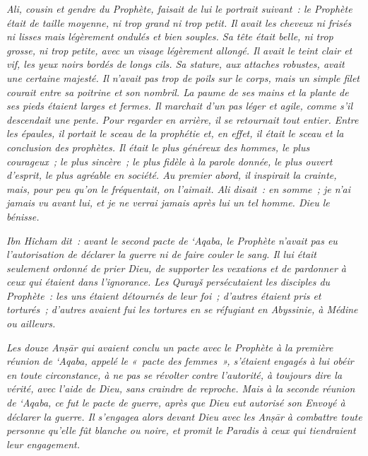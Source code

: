 \emph{Ali, cousin et gendre du Prophète, faisait de lui le portrait
suivant~: le Prophète était de taille moyenne, ni trop grand ni trop
petit. Il avait les cheveux ni frisés ni lisses mais légèrement ondulés
et bien souples. Sa tête était belle, ni trop grosse, ni trop petite,
avec un visage légèrement allongé. Il avait le teint clair et vif, les
yeux noirs bordés de longs cils. Sa stature, aux attaches robustes,
avait une certaine majesté. Il n'avait pas trop de poils sur le corps,
mais un simple filet courait entre sa poitrine et son nombril. La paume
de ses mains et la plante de ses pieds étaient larges et fermes. Il
marchait d'un pas léger et agile, comme s'il descendait une pente. Pour
regarder en arrière, il se retournait tout entier. Entre les épaules, il
portait le sceau de la prophétie et, en effet, il était le sceau et la
conclusion des prophètes. Il était le plus généreux des hommes, le plus
courageux~; le plus sincère~; le plus fidèle à la parole donnée, le plus
ouvert d'esprit, le plus agréable en société. Au premier abord, il
inspirait la crainte, mais, pour peu qu'on le fréquentait, on l'aimait.
Ali disait~: en somme~; je n'ai jamais vu avant lui, et je ne verrai
jamais après lui un tel homme. Dieu le bénisse.}


\emph{Ibn Hîcham dit~: avant le second pacte de `Aqaba, le Prophète
n'avait pas eu l'autorisation de déclarer la guerre ni de faire couler
le sang. Il lui était seulement ordonné de prier Dieu, de supporter les
vexations et de pardonner à ceux qui étaient dans l'ignorance. Les
Qurayš persécutaient les disciples du Prophète~: les uns étaient
détournés de leur foi~; d'autres étaient pris et torturés~; d'autres
avaient fui les tortures en se réfugiant en Abyssinie, à Médine ou
ailleurs.}

\emph{Les douze Anṣār qui avaient conclu un pacte avec} \emph{le
Prophète à la première réunion de `Aqaba, appelé le «~pacte des
femmes~», s'étaient engagés à lui obéir en toute circonstance, à ne pas
se révolter contre l'autorité, à toujours dire la vérité, avec l'aide de
Dieu, sans craindre de reproche. Mais à la seconde réunion de `Aqaba, ce
fut le pacte de guerre, après que Dieu eut autorisé son Envoyé à
déclarer la guerre. Il s'engagea alors devant Dieu avec les Anṣār à
combattre toute personne qu'elle fût blanche ou noire, et promit le
Paradis à ceux qui tiendraient leur engagement.}

